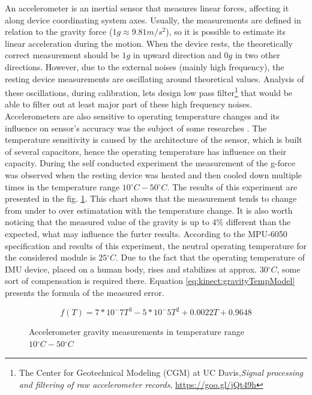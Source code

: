 \documentclass[sensors,article,submit,moreauthors,pdftex,10pt,a4paper]{mdpi}
\newcommand{\degree}{\ensuremath{{}^{\circ}}\xspace}
\begin{document}
An accelerometer is an inertial sensor that measures linear forces, affecting it along device coordinating system axes. Usually, the measurements are defined in relation to the gravity force ($1g \approx 9.81  m/{s^2}$), so it is possible to estimate its linear acceleration during the motion. When the device rests, the theoretically correct measurement should be $1g$ in upward direction and $0g$ in two other directions. However, due to the external noises (mainly high frequency), the resting device measurements are oscillating around theoretical values. Analysis of these oscillations, during calibration, lets design low pass filter\footnote{The Center for Geotechnical Modeling (CGM) at UC Davis,\textit{Signal processing and filtering of raw accelerometer records}, \url{https://goo.gl/jQt49h}}\cite{Wang2011} that would be able to filter out at least major part of these high frequency noises. Accelerometers are also sensitive to operating temperature changes and its influence on sensor’s accuracy was the subject of some researches \cite{Schneider2006, Grigorie1996}. The temperature sensitivity is caused by the architecture of the sensor, which is built of several capacitors, hence the operating temperature has influence on their capacity. During the self conducted experiment the measurement of the g-force was observed when the resting device was heated and then cooled down multiple times in the temperature range $10\degree C - 50\degree C$. The results of this experiment are presented in the fig. \ref{fig:imu:tmep}. This chart shows that the measurement tends to change from under to over estimatation with the temperature change. It is also worth noticing that the measured value of the gravity is up to $4\%$ different than the expected, what may influence the furter results. According to the MPU-6050 specification and results of this experiment, the neutral operating temperature for the considered module is $25\degree C$. Due to the fact that the operating temperature of IMU device, placed on a human body, rises and stabilizes at approx. $30 \degree C$, some sort of compensation is required there. Equation \ref{eq:kinect:gravityTempModel} presents the formula of the measured error.

\begin{equation}
f(T) = 7*10^-7 T^3 - 5*10^-5 T^2 + 0.0022T + 0.9648
\label{eq:kinect:gravityTempModel}
\end{equation}

\begin{figure}[H]
	\centering
		
	\caption{Accelerometer gravity measurements in temperature range $10\degree C - 50\degree C$}
	\label{fig:imu:tmep}
\end{figure}
\end{document}
